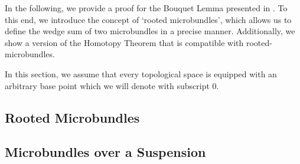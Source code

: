 \begin{myparagraph}
    In the following,
    we provide a proof for the Bouquet Lemma presented in .
    To this end, we introduce the concept of `rooted microbundles',
    which allows us to define the wedge sum of two microbundles in a precise manner.
    Additionally, we show a version of the Homotopy Theorem
    that is compatible with rooted-microbundles.

    In this section,
    we assume that every topological space is equipped with an arbitrary base point
    which we will denote with subscript $0$.
\end{myparagraph}
\subsection*{Rooted Microbundles}\label{section::rooted}{\blankbreak}




\subsection*{Microbundles over a Suspension}\label{section::suspension}{\blankbreak}







